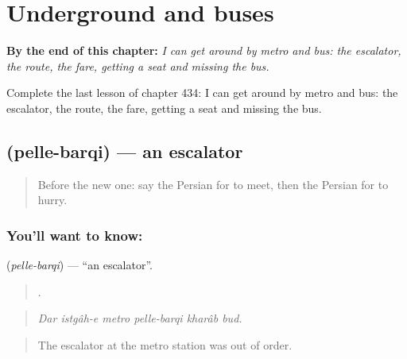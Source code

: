 
\chapter{Underground and buses}
\label{ch:fa-underground-and-buses}

\begin{chapteropening}
\textbf{By the end of this chapter:} \emph{I can get around by metro and bus: the escalator, the route, the fare, getting a seat and missing the bus.}

Complete the last lesson of chapter 434: I can get around by metro and bus: the escalator, the route, the fare, getting a seat and missing the bus.
\end{chapteropening}

\section[\texorpdfstring{\fa{پله} \fa{برقی} (pelle-barqi)}{پله برقی (pelle-barqi)}]{  (pelle-barqi) — an escalator}

\label{lesson:FA-C434-pelle-barqi}



\begin{quote}
Before the new one: say the Persian for to meet, then the Persian for to hurry.
\end{quote}

\subsection*{You'll want to know:  }
\textbf{ } (\emph{pelle-barqi}) — \textquotedblleft{}an escalator\textquotedblright{}.

\begin{quote}
      .
\end{quote}

\begin{quote}
\emph{Dar istgâh-e metro pelle-barqi kharâb bud.}
\end{quote}

\begin{quote}
The escalator at the metro station was out of order.
\end{quote}

